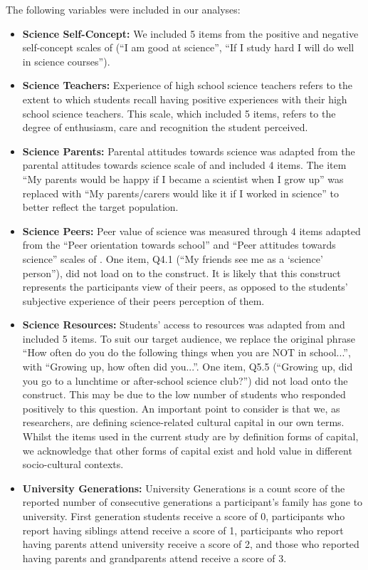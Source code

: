 The following variables were included in our analyses:
\begin{itemize}
    \item \textbf{Science Self-Concept:} We included 5 items from the positive and negative self-concept scales of \cite{dewitt2011high} (``I am good at science'', ``If I study hard I will do well in science courses'').   
    \item \textbf{Science Teachers:} Experience of high school science teachers refers to the extent to which students recall having positive experiences with their high school science teachers. This scale, which included 5 items, refers to the degree of enthusiasm, care and recognition the student perceived. 
    \item \textbf{Science Parents:} Parental attitudes towards science was adapted from the parental attitudes towards science scale of \cite{dewitt2011high} and included 4 items. The item ``My parents would be happy if I became a scientist when I grow up'' was replaced with ``My parents/carers would like it if I worked in science'' to better reflect the target population.
    \item \textbf{Science Peers:} Peer value of science was measured through 4 items adapted from the ``Peer orientation towards school'' and ``Peer attitudes towards science'' scales of \cite{dewitt2011high}. One item, Q4.1 (``My friends see me as a `science' person''), did not load on to the construct. It is likely that this construct represents the participants view of their peers, as opposed to the students' subjective experience of their peers perception of them.
    \item \textbf{Science Resources:} Students' access to resources was adapted from \cite{dewitt2011high} and included 5 items. To suit our target audience, we replace the original phrase ``How often do you do the following things when you are NOT in school...'', with ``Growing up, how often did you...''. One item, Q5.5 (``Growing up, did you go to a lunchtime or after-school science club?'') did not load onto the construct. This may be due to the low number of students who responded positively to this question. An important point to consider is that we, as researchers, are defining science-related cultural capital in our own terms. Whilst the items used in the current study are by definition forms of capital, we acknowledge that other forms of capital exist and hold value in different socio-cultural contexts.
    \item \textbf{University Generations:} University Generations is a count score of the reported number of consecutive generations a participant's family has gone to university. First generation students receive a score of 0,  participants who report having siblings attend receive a score of 1, participants who report having parents attend university receive a score of 2, and those who reported having parents and grandparents attend receive a score of 3.

\end{itemize}
